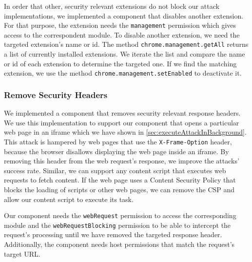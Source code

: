 	In order that other, security relevant extensions do not block our attack implementations, we implemented a component that disables another extension. For that purpose, the extension needs the \texttt{management} permission which gives access to the correspondent module. To disable another extension, we need the targeted extension's name or id.
	The method \lstinline|chrome.management.getAll| returns a list of currently installed extensions. We iterate the list and compare the name or id of each extension to determine the targeted one. If we find the matching extension, we use the method \lstinline|chrome.management.setEnabled| to deactivate it.

\subsubsection{Remove Security Headers}
\label{sec:removeSecurityHeaders}
	
	We implemented a component that removes security relevant response headers. We use this implementation to support our component that opens a particular web page in an iframe which we have shown in \autoref{sec:executeAttackInBackground}. This attack is hampered by web pages that use the \texttt{X-Frame-Option} header, because the browser disallows displaying the web page inside an iframe. By removing this header from the web request's response, we improve the attacks' success rate. Similar, we can support any content script that executes web requests to fetch content. If the web page uses a Content Security Policy that blocks the loading of scripts or other web pages, we can remove the CSP and allow our content script to execute its task.
	
	Our component needs the \texttt{webRequest} permission to access the corresponding module and the \texttt{webRequestBlocking} permission to be able to intercept the request's processing until we have removed the targeted response header. Additionally, the component needs host permissions that match the request's target URL. 